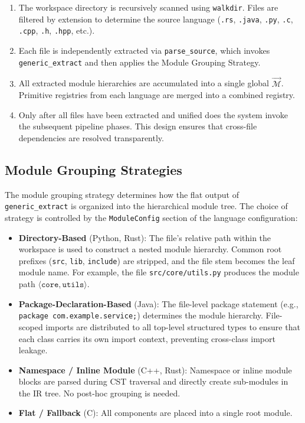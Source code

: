 \begin{enumerate}
  \item The workspace directory is recursively scanned using
    \texttt{walkdir}. Files are filtered by extension to determine
    the source language (\texttt{.rs}, \texttt{.java}, \texttt{.py},
    \texttt{.c}, \texttt{.cpp}, \texttt{.h}, \texttt{.hpp}, etc.).
  \item Each file is independently extracted via
    \texttt{parse\_source}, which invokes \texttt{generic\_extract}
    and then applies the Module Grouping Strategy.
  \item All extracted module hierarchies are accumulated into a
    single global $\vec{\mathcal{M}}$. Primitive registries from each
    language are merged into a combined registry.
  \item Only after all files have been extracted and unified does the
    system invoke the subsequent pipeline phases. This design ensures
    that cross-file dependencies are resolved transparently.
\end{enumerate}

\subsection{Module Grouping Strategies}
\label{sec:module_strategies}

The module grouping strategy determines how the flat output of
\texttt{generic\_extract} is organized into the hierarchical module
tree. The choice of strategy is controlled by the
\texttt{ModuleConfig} section of the language configuration:

\begin{itemize}
  \item \textbf{Directory-Based} (Python, Rust): The file's relative
    path within the workspace is used to construct a nested module
    hierarchy. Common root prefixes (\texttt{src}, \texttt{lib},
    \texttt{include}) are stripped, and the file stem becomes the
    leaf module name. For example, the file
    \texttt{src/core/utils.py} produces the module path $\langle
    \texttt{core}, \texttt{utils} \rangle$.
  \item \textbf{Package-Declaration-Based} (Java): The file-level
    package statement (e.g., \texttt{package com.example.service;})
    determines the module hierarchy. File-scoped imports are
    distributed to all top-level structured types to ensure that each
    class carries its own import context, preventing cross-class import leakage.
  \item \textbf{Namespace / Inline Module} (C++, Rust): Namespace or
    inline module blocks are parsed during CST traversal and directly
    create sub-modules in the IR tree. No post-hoc grouping is needed.
  \item \textbf{Flat / Fallback} (C): All components are placed into
    a single root module.
\end{itemize}

